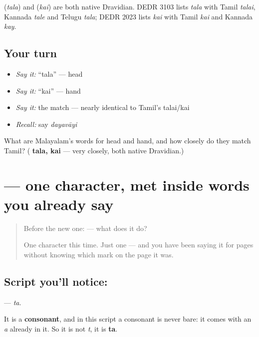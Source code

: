 \begin{cousinweb}
\textbf{} (\emph{tala}) and \textbf{} (\emph{kai}) are both native Dravidian. DEDR 3103 lists \emph{tala} with Tamil \emph{talai}, Kannada \emph{tale} and Telugu \emph{tala}; DEDR 2023 lists \emph{kai} with Tamil \emph{kai} and Kannada \emph{kay}.
\end{cousinweb}

\subsection*{Your turn}
\begin{itemize}
\raggedright
  \item \emph{Say it:} \textquotedblleft{}tala\textquotedblright{} — head
  \item \emph{Say it:} \textquotedblleft{}kai\textquotedblright{} — hand
  \item \emph{Say it:} the match — nearly identical to Tamil's talai/kai
  \item \emph{Recall:} say \emph{dayavāyi}
\end{itemize}

\begin{tcolorbox}[breakable,colback=teal!4,colframe=teal!35!black,title={Before you move on}]
What are Malayalam's words for head and hand, and how closely do they match Tamil? (\textbf{ tala,  kai} — very closely, both native Dravidian.)
\end{tcolorbox}
\section[\texorpdfstring{\ml{ത} (ta)}{ത (ta)}]{ — one character, met inside words you already say}

\label{lesson:ML-S08-letter-ta}



\begin{quote}
Before the new one:  — what does it do?

One character this time. Just one — and you have been saying it for pages without knowing which mark on the page it was.
\end{quote}

\subsection*{Script you'll notice: }
\textbf{} — \emph{ta}.

It is a \textbf{consonant}, and in this script a consonant is never bare: it comes with an \emph{a} already in it. So it is not \emph{t}, it is \textbf{ta}.

